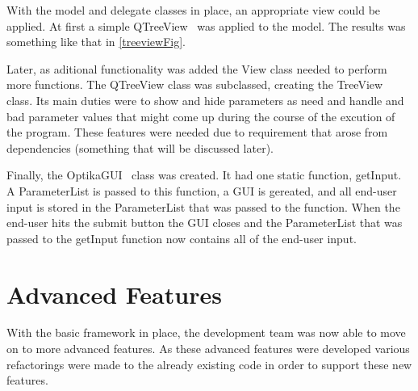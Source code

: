 With the model and delegate classes in place, an appropriate view could be applied. At first a simple
QTreeView~\cite{QTreeView} was applied to the model. The results was something like that in \ref{treeviewFig}.
	\begin{figure}[h]
		\centering
	\end{figure}
Later, as aditional functionality was added the View class needed to perform more functions. The QTreeView class was subclassed, creating
the TreeView~\cite{TreeView} class. Its main duties were to show and hide parameters as need and handle and bad parameter values that might
come up during the course of the excution of the program. These features were needed due to requirement that arose from dependencies (something
that will be discussed later).

Finally, the OptikaGUI~\cite{OptikaGUI} class was created. It had one static function, getInput. A ParameterList is passed to this function, a
GUI is gereated, and all end-user input is stored in the ParameterList that was passed to the function. When the end-user hits the submit
button the GUI closes and the ParameterList that was passed to the getInput function now contains all of the end-user input.

\section{Advanced Features}
With the basic framework in place, the development team was now able to move on to more advanced features. As these advanced features
were developed various refactorings were made to the already existing code in order to support these new features.

